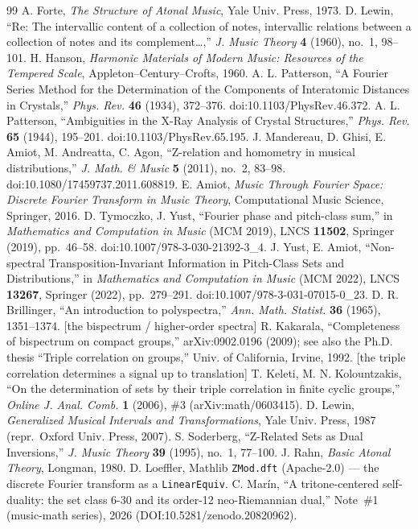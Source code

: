 \documentclass[11pt]{article}
\newcommand{\lean}[1]{\texttt{#1}}
\begin{document}
\begin{thebibliography}{99}
 A. Forte, \emph{The Structure of Atonal Music}, Yale Univ. Press, 1973.
 D. Lewin, ``Re: The intervallic content of a collection of notes, intervallic relations
  between a collection of notes and its complement\dots,'' \emph{J. Music Theory} \textbf{4} (1960),
  no.~1, 98--101.
 H. Hanson, \emph{Harmonic Materials of Modern Music: Resources of the Tempered Scale},
  Appleton--Century--Crofts, 1960.
 A. L. Patterson, ``A Fourier Series Method for the Determination of the Components of
  Interatomic Distances in Crystals,'' \emph{Phys. Rev.} \textbf{46} (1934), 372--376.
  doi:10.1103/PhysRev.46.372.
 A. L. Patterson, ``Ambiguities in the X-Ray Analysis of Crystal Structures,''
  \emph{Phys. Rev.} \textbf{65} (1944), 195--201. doi:10.1103/PhysRev.65.195.
 J. Mandereau, D. Ghisi, E. Amiot, M. Andreatta, C. Agon, ``Z-relation and homometry in
  musical distributions,'' \emph{J. Math. \& Music} \textbf{5} (2011), no.~2, 83--98.
  doi:10.1080/17459737.2011.608819.
 E. Amiot, \emph{Music Through Fourier Space: Discrete Fourier Transform in Music Theory},
  Computational Music Science, Springer, 2016.
 D. Tymoczko, J. Yust, ``Fourier phase and pitch-class sum,'' in \emph{Mathematics and
  Computation in Music} (MCM 2019), LNCS \textbf{11502}, Springer (2019), pp.~46--58.
  doi:10.1007/978-3-030-21392-3\_4.
 J. Yust, E. Amiot, ``Non-spectral Transposition-Invariant Information in Pitch-Class Sets and
  Distributions,'' in \emph{Mathematics and Computation in Music} (MCM 2022), LNCS \textbf{13267}, Springer
  (2022), pp.~279--291. doi:10.1007/978-3-031-07015-0\_23.
 D. R. Brillinger, ``An introduction to polyspectra,'' \emph{Ann. Math. Statist.}
  \textbf{36} (1965), 1351--1374. [the bispectrum / higher-order spectra]
 R. Kakarala, ``Completeness of bispectrum on compact groups,'' arXiv:0902.0196 (2009);
  see also the Ph.D. thesis ``Triple correlation on groups,'' Univ. of California, Irvine, 1992. [the
  triple correlation determines a signal up to translation]
 T. Keleti, M. N. Kolountzakis, ``On the determination of sets by their triple correlation in
  finite cyclic groups,'' \emph{Online J. Anal. Comb.} \textbf{1} (2006), \#3 (arXiv:math/0603415).
 D. Lewin, \emph{Generalized Musical Intervals and Transformations}, Yale Univ. Press,
  1987 (repr.\ Oxford Univ. Press, 2007).
 S. Soderberg, ``Z-Related Sets as Dual Inversions,'' \emph{J. Music Theory} \textbf{39}
  (1995), no.~1, 77--100.
 J. Rahn, \emph{Basic Atonal Theory}, Longman, 1980.
 D. Loeffler, Mathlib \lean{ZMod.dft} (Apache-2.0) --- the discrete Fourier transform as
  a \lean{LinearEquiv}.
 C. Mar\'in, ``A tritone-centered self-duality: the set class 6-30 and its order-12
  neo-Riemannian dual,'' Note~\#1 (music-math series), 2026 (DOI:10.5281/zenodo.20820962).
\end{thebibliography}
\end{document}
